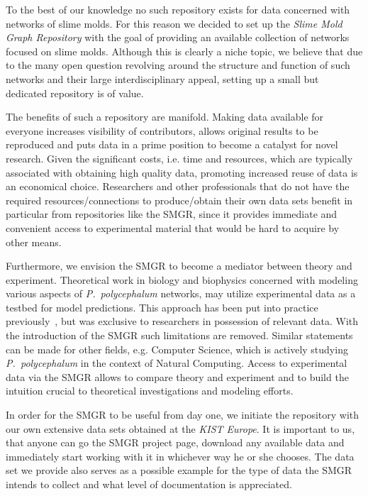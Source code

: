 	To the best of our knowledge no such repository exists for data concerned with networks of slime molds. For this reason we decided to set up the \emph{Slime Mold Graph Repository} with the goal of providing an available collection of networks focused on slime molds. Although this is clearly a niche topic, we believe that due to the many open question revolving around the structure and function of such networks and their large interdisciplinary appeal, setting up a small but dedicated repository is of value.

	The benefits of such a repository are manifold. Making data available for everyone increases visibility of contributors, allows original results to be reproduced and puts data in a prime position to become a catalyst for novel research. Given the significant costs, i.e. time and resources, which are typically associated with obtaining high quality data, promoting increased reuse of data is an economical choice. Researchers and other professionals that do not have the required resources/connections to produce/obtain their own data sets benefit in particular from repositories like the SMGR, since it provides immediate and convenient access to experimental material that would be hard to acquire by other means. 

	Furthermore, we envision the SMGR to become a mediator between theory and experiment. Theoretical work in biology and biophysics concerned with modeling various aspects of \emph{P.~polycephalum} networks, may utilize experimental data as a testbed for model predictions. This approach has been put into practice previously~\cite{baumgarten2015network}, but was exclusive to researchers in possession of relevant data. With the introduction of the SMGR such limitations are removed. Similar statements can be made for other fields, e.g. Computer Science, which is actively studying \emph{P.~polycephalum} in the context of Natural Computing. Access to experimental data via the SMGR allows to compare theory and experiment and to build the intuition crucial to theoretical investigations and modeling efforts. 

 	In order for the SMGR to be useful from day one, we initiate the repository with our own extensive data sets obtained at the \emph{KIST Europe}. It is important to us, that anyone can go the SMGR project page, download any available data and immediately start working with it in whichever way he or she chooses. The data set we provide also serves as a possible example for the type of data the SMGR intends to collect and what level of documentation is appreciated. 

